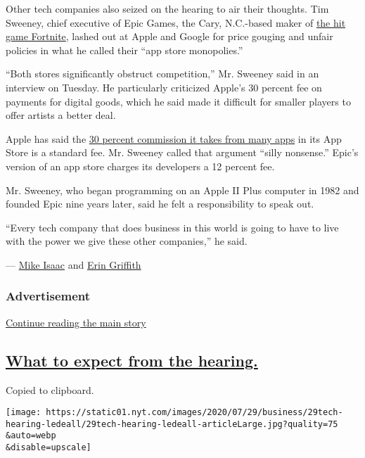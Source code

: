 Other tech companies also seized on the hearing to air their thoughts.
Tim Sweeney, chief executive of Epic Games, the Cary, N.C.-based maker
of
\href{https://www.nytimes.com/2018/07/25/arts/what-is-fortnite-battle-royale-nyt.html}{the
hit game Fortnite}, lashed out at Apple and Google for price gouging and
unfair policies in what he called their ``app store monopolies.''

``Both stores significantly obstruct competition,'' Mr. Sweeney said in
an interview on Tuesday. He particularly criticized Apple's 30 percent
fee on payments for digital goods, which he said made it difficult for
smaller players to offer artists a better deal.

Apple has said the
\href{https://www.nytimes.com/2020/07/28/technology/apple-app-store-airbnb-classpass.html}{30
percent commission it takes from many apps} in its App Store is a
standard fee. Mr. Sweeney called that argument ``silly nonsense.''
Epic's version of an app store charges its developers a 12 percent fee.

Mr. Sweeney, who began programming on an Apple II Plus computer in 1982
and founded Epic nine years later, said he felt a responsibility to
speak out.

``Every tech company that does business in this world is going to have
to live with the power we give these other companies,'' he said.

--- \href{https://www.nytimes.com/by/mike-isaac}{Mike Isaac} and
\href{https://www.nytimes.com/by/erin-griffith}{Erin Griffith}

\hypertarget{advertisement-4}{%
\subsubsection{Advertisement}\label{advertisement-4}}

\protect\hyperlink{after-dfp-ad-mid2}{Continue reading the main story}

\hypertarget{what-to-expect-from-the-hearing}{%
\subsection{\texorpdfstring{\protect\hyperlink{what-to-expect-from-the-hearing}{What
to expect from the
hearing.}}{What to expect from the hearing.}}\label{what-to-expect-from-the-hearing}}

Copied to clipboard.

\texttt{[image: https://static01.nyt.com/images/2020/07/29/business/29tech-hearing-ledeall/29tech-hearing-ledeall-articleLarge.jpg?quality=75\\\&auto=webp\\\&disable=upscale]}

